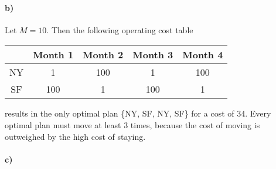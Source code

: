 \documentclass[12pt]{article}
\begin{document}
\paragraph{b)}

Let \(M=10\). Then the following operating cost table
\begin{center}
        \begin{tabular}{c | c c c c}
                & Month 1 & Month 2 & Month 3 & Month 4\\
                \hline
                NY & 1 & 100 & 1 & 100\\
                SF & 100 & 1 & 100 & 1 \\
        \end{tabular}
\end{center}
results in the only optimal plan \{NY, SF, NY, SF\} for a cost of \(34\). Every optimal plan must move at least
\(3\) times, because the cost of moving is outweighed by the high cost of staying.

\paragraph{c)}
\end{document}
